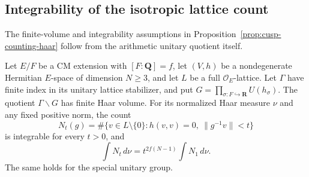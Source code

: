 \subsection{Integrability of the isotropic lattice count}
\label{sec:arithmetic-isotropic-integrability}

The finite-volume and integrability assumptions in
Proposition~\ref{prop:cusp-counting-haar} follow from the arithmetic
unitary quotient itself.

\begin{proposition}\label{prop:arithmetic-isotropic-integrability}
Let $E/F$ be a CM extension with $[F:\mathbf Q]=f$, let $(V,h)$
be a nondegenerate Hermitian $E$-space of dimension $N\ge3$, and
let $L$ be a full $\mathcal O_E$-lattice. Let $\Gamma$ have finite
index in its unitary lattice stabilizer, and put
$G=\prod_{\sigma:F\hookrightarrow\mathbf R}U(h_\sigma)$.
The quotient $\Gamma\backslash G$ has finite Haar volume. For its
normalized Haar measure $\nu$ and any fixed positive norm, the count
\[
 N_t(g)=\#\{v\in L\setminus\{0\}:h(v,v)=0,\ \|g^{-1}v\|<t\}
\]
is integrable for every $t>0$, and
\[
            \int N_t\,d\nu=t^{2f(N-1)}\int N_1\,d\nu.
\]
The same holds for the special unitary group.
\end{proposition}

